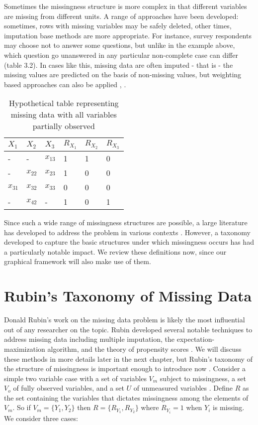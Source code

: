 \documentclass[12pt,twoside]{reedthesis}
\theoremstyle{definition}
\begin{document}
Sometimes the missingness structure is more complex in that different variables are missing from different units. A range of approaches have been developed: sometimes, rows with missing variables may be safely deleted, other times, imputation base methods are more appropriate.  For instance, survey respondents may choose not to answer some questions, but unlike in the example above, which question go unanswered in any particular non-complete case can differ (table 3.2). In cases like this, missing data are often imputed - that is - the missing values are predicted on the basis of non-missing values, but weighting based approaches can also be applied \citep{Little_1986}, \citep{Seaman_2011}. 

\begin{table}[]
\centering
\begin{tabular}{|l|l|l|l|l|l}
$X_1$    & $X_2$    & $X_3$    & $R_{X_1}$ & $R_{X_2}$ & $R_{X_3}$ \\ \hline
-        & -        & $x_{13}$ & 1         & 1         & 0         \\
-        & $x_{22}$ & $x_{23}$ & 1         & 0         & 0         \\
$x_{31}$ & $x_{32}$ & $x_{33}$ & 0         & 0         & 0         \\
-        & $x_{42}$ & -        & 1         & 0         & 1        
\end{tabular}
\caption{Hypothetical table representing missing data with all variables partially observed}
\end{table}

Since such a wide range of missingness structures are possible, a large  literature has developed to address the problem in various contexts \citep{Schafer_2002}.  However, a taxonomy developed to capture the basic structures under which missingness occurs has had a particularly notable impact. We review these definitions now, since our graphical framework will also make use of them. 
\section{Rubin's Taxonomy of Missing Data}

Donald Rubin's work on the missing data problem is likely the most influential out of any researcher on the topic. Rubin developed several notable techniques to address missing data including multiple imputation, the expectation-maximization algorithm, and the theory of propensity scores \citep{Little_1986}. We will discuss these methods in more details later in the next chapter, but Rubin's taxonomy of the structure of missingness is important enough to introduce now \citep{Rubin_1976}. Consider a simple two variable case with a set of variables $V_m$ subject to missingness, a set $V_o$ of  fully observed variables, and a set $U$ of unmeasured variables \citep{Mohan_2013}. Define $R$ as the set containing the variables that dictates missingness among the elements of $V_m$. So if $V_m = \{Y_1, Y_2\}$ then $R = \{R_{Y_1}, R_{Y_2}\}$ where $R_{Y_i} = 1$ when $Y_i$ is missing. We consider three cases:
\end{document}
